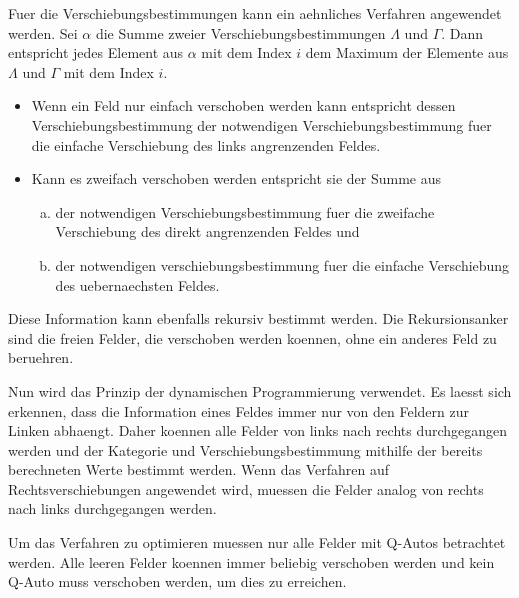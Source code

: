 \documentclass[a4paper,10pt,ngerman]{scrartcl}
\begin{document}
Fuer die Verschiebungsbestimmungen kann ein aehnliches Verfahren angewendet werden.
Sei $\alpha$ die Summe zweier Verschiebungsbestimmungen $\Lambda$ und $\Gamma$.
Dann entspricht jedes Element aus $\alpha$ mit dem Index $i$ dem Maximum der Elemente aus $\Lambda$ und $\Gamma$ mit dem Index $i$.

\begin{itemize}
    \item Wenn ein Feld nur einfach verschoben werden kann entspricht dessen Verschiebungsbestimmung der notwendigen Verschiebungsbestimmung fuer die einfache Verschiebung des links angrenzenden Feldes.
    \item Kann es zweifach verschoben werden entspricht sie der Summe aus
          \begin{enumerate}[a)]
              \item der notwendigen Verschiebungsbestimmung fuer die zweifache Verschiebung des direkt angrenzenden Feldes und
              \item der notwendigen verschiebungsbestimmung fuer die einfache Verschiebung des uebernaechsten Feldes.
          \end{enumerate}
\end{itemize}
Diese Information kann ebenfalls rekursiv bestimmt werden.
Die Rekursionsanker sind die freien Felder, die verschoben werden koennen, ohne ein anderes Feld zu beruehren.

Nun wird das Prinzip der dynamischen Programmierung verwendet.
Es laesst sich erkennen, dass die Information eines Feldes immer nur von den Feldern zur Linken abhaengt.
Daher koennen alle Felder von links nach rechts durchgegangen werden und der Kategorie und Verschiebungsbestimmung mithilfe der bereits berechneten Werte bestimmt werden.
Wenn das Verfahren auf Rechtsverschiebungen angewendet wird, muessen die Felder analog von rechts nach links durchgegangen werden.

Um das Verfahren zu optimieren muessen nur alle Felder mit Q-Autos betrachtet werden.
Alle leeren Felder koennen immer beliebig verschoben werden und kein Q-Auto muss verschoben werden, um dies zu erreichen.
\end{document}
